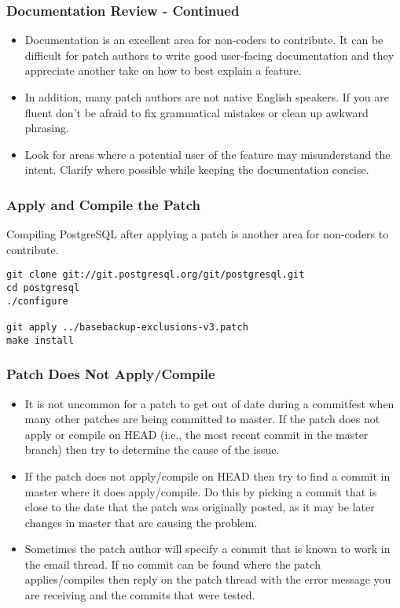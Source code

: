 \begin{frame}[fragile]
    \frametitle{Documentation Review - Continued}

    \begin{itemize}
        \item Documentation is an excellent area for non-coders to contribute.  It can be difficult for patch authors to write good user-facing documentation and they appreciate another take on how to best explain a feature.\pause

        \item In addition, many patch authors are not native English speakers.  If you are fluent don't be afraid to fix grammatical mistakes or clean up awkward phrasing.\pause

        \item Look for areas where a potential user of the feature may misunderstand the intent.  Clarify where possible while keeping the documentation concise.
    \end{itemize}
\end{frame}

\begin{frame}[fragile]
    \frametitle{Apply and Compile the Patch}

    Compiling PostgreSQL after applying a patch is another area for non-coders to contribute.
    \vspace{1em}

    \begin{lstlisting}
git clone git://git.postgresql.org/git/postgresql.git
cd postgresql
./configure

git apply ../basebackup-exclusions-v3.patch
make install
    \end{lstlisting}
\end{frame}

\begin{frame}
    \frametitle{Patch Does Not Apply/Compile}

    \begin{itemize}
        \item It is not uncommon for a patch to get out of date during a commitfest when many other patches are being committed to master.  If the patch does not apply or compile on HEAD (i.e., the most recent commit in the master branch) then try to determine the cause of the issue.\pause

        \item If the patch does not apply/compile on HEAD then try to find a commit in master where it does apply/compile.  Do this by picking a commit that is close to the date that the patch was originally posted, as it may be later changes in master that are causing the problem.\pause

        \item Sometimes the patch author will specify a commit that is known to work in the email thread.  If no commit can be found where the patch applies/compiles then reply on the patch thread with the error message you are receiving and the commits that were tested.
    \end{itemize}
\end{frame}

